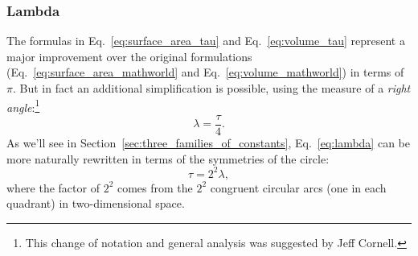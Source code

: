 \subsubsection{Lambda} %
\label{sec:lambda}

The formulas in Eq.~\eqref{eq:surface_area_tau} and Eq.~\eqref{eq:volume_tau} represent a major improvement over the original formulations (Eq.~\eqref{eq:surface_area_mathworld} and Eq.~\eqref{eq:volume_mathworld}) in terms of $\pi$. But in fact an additional simplification is possible, using the measure of a \emph{right angle}:\footnote{This change of notation and general analysis was suggested by Jeff Cornell.}
\begin{equation}
\label{eq:lambda}
\lambda = \frac{\tau}{4}.
\end{equation}
As we'll see in Section~\ref{sec:three_families_of_constants}, Eq.~\eqref{eq:lambda} can be more naturally rewritten in terms of the symmetries of the circle:
\begin{equation}
\label{eq:tau_lambda}
\tau = 2^2 \lambda,
\end{equation}
where the factor of $2^2$ comes from the $2^2$ congruent circular arcs (one in each quadrant) in two-dimensional space.

